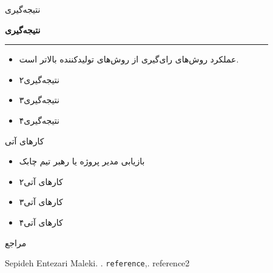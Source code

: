 \documentclass[final,hyperref={pdfpagelabels=false}]{beamer}
\begin{document}
\begin{frame}[t]
\begin{columns}[t]
\begin{column}{.465\textwidth}
\begin{block}{نتیجه‌گیری}

\begin{center} \textbf{نتیجه‌گیری} \end{center}
\vspace{-10mm}
\begin{center} \textcolor{white2}{\rule{0.5\linewidth}{0.5}} \end{center} 

\begin{itemize}

\item عملکرد روش‌های رای‌گیری از روش‌های تولیدکننده بالاتر است.

\item نتیجه‌گیری۲
\item نتیجه‌گیری۳
\item نتیجه‌گیری۴
    
\end{itemize}
\end{block}


\begin{block}{کار‌های آتی}
\begin{itemize}

\item بازیابی مدیر پروژه یا رهبر تیم چابک
\item کار‌های آتی۲
\item کار‌های آتی۳
\item کار‌های آتی۴


\end{itemize}
\end{block}




\begin{block}{مراجع}
%
%

\begin{latin}
\begin{thebibliography}{9}
Sepideh Entezari Maleki.
 .
 \newblock \texttt{reference},.
 reference2

\end{thebibliography}
\end{latin}
\end{block}


\end{column} %

\begin{column}{.015\textwidth}\end{column} %


\end{columns}
\end{frame}
\end{document}
